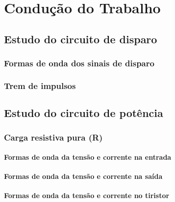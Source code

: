 \documentclass[a4paper,11pt]{article}
\numberwithin{equation}{section}
\begin{document}
\section{Condução do Trabalho}

\subsection{Estudo do circuito de disparo}

\subsubsection{Formas de onda dos sinais de disparo}



\subsubsection{Trem de impulsos}


\subsection{Estudo do circuito de potência}

\subsubsection{Carga resistiva pura (R)}

\paragraph{Formas de onda da tensão e corrente na entrada}


\paragraph{Formas de onda da tensão e corrente na saída}



\paragraph{Formas de onda da tensão e corrente no tiristor}

\end{document}
